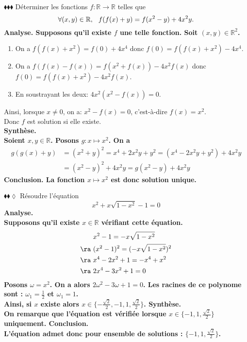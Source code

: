 \documentclass[11pt]{article}
\begin{document}
\begin{exercice}{$\blacklozenge\blacklozenge\blacklozenge$}{}
    Déterminer les fonctions $f: \mathbb{R} \rightarrow \mathbb{R}$ telles que 
    \begin{equation*}
        \forall{(x,y)\in\mathbb{R}}, \hspace{0.25cm} f(f(x)+y) = f(x^2-y)+4x^2y.
    \end{equation*}
    \tcblower
    \bf{Analyse.}
    Supposons qu'il existe $f$ une telle fonction. Soit $(x,y)\in\mathbb{R}^2$. 
    \begin{enumerate}[topsep=0pt,itemsep=-0.9 ex]
        \item On a $f(f(x)+x^2)=f(0)+4x^4$ donc $f(0)=f(f(x)+x^2)-4x^4$.
        \item On a $f(f(x)-f(x))=f(x^2+f(x))-4x^2f(x)$ donc $f(0)=f(f(x)+x^2)-4x^2f(x)$. 
        \item En soustrayant les deux: $4x^2(x^2 - f(x)) = 0$.
    \end{enumerate}
    Ainsi, lorsque $x\neq0$, on a: $x^2-f(x) = 0$, c'est-à-dire $f(x)=x^2$.\\
    Donc $f$ est solution si elle existe.\\[0.2cm]
    \bf{Synthèse.}\\
    Soient $x,y\in\mathbb{R}$. Posons $g:x\mapsto x^2$. On a
    \begin{align*}
        g(g(x)+y)&=(x^2+y)^2 = x^4 + 2x^2y + y^2 = (x^4-2x^2y+y^2)+4x^2y\\
        &=(x^2-y)^2+4x^2y=g(x^2-y)+4x^2y
    \end{align*}
    \bf{Conclusion.} La fonction $x\mapsto x^2$ est donc solution unique.
\end{exercice}

\begin{exercice}{$\blacklozenge\blacklozenge\lozenge$}{}
    Résoudre l'équation
    \begin{equation*}
        x^2 + x\sqrt{1-x^2}-1=0
    \end{equation*}
    \tcblower
    \bf{Analyse.}\\
    Supposons qu'il existe $x\in\mathbb{R}$ vérifiant cette équation.
    \begin{align*}
        &x^2-1=-x\sqrt{1-x^2}\\
        \ra~& (x^2-1)^2=(-x\sqrt{1-x^2})^2\\
        \ra~& x^4 - 2x^2 + 1 = -x^4+x^2\\
        \ra~& 2x^4-3x^2+1=0
    \end{align*}
    Posons $\omega=x^2$. On a alors $2\omega^2-3\omega+1=0$. Les racines de ce polynome sont : $\omega_1=\frac{1}{2}$ et $\omega_1=1$.\\
    Ainsi, si $x$ existe alors $x\in\{-\frac{\sqrt{2}}{2},-1,1,\frac{\sqrt{2}}{2}\}$.\n
    \bf{Synthèse.}\\
    On remarque que l'équation est vérifiée lorsque $x\in\{-1,1,\frac{\sqrt{2}}{2}\}$ uniquement.\n
    \bf{Conclusion.}\\
    L'équation admet donc pour ensemble de solutions : $\{-1,1,\frac{\sqrt{2}}{2}\}$.
\end{exercice}
\end{document}
